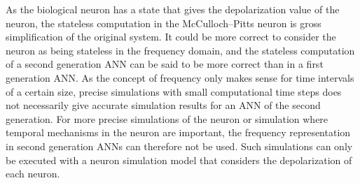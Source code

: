 	As the biological neuron has a state that gives the depolarization value of the neuron, the stateless computation in the McCulloch--Pitts neuron is gross simplification of the original system.
	It could be more correct to consider the neuron as being stateless in the frequency domain, and the stateless computation of a second generation ANN can be said to be more correct than in a first generation ANN.
	As the concept of frequency only makes sense for time intervals of a certain size, precise simulations with small computational time steps does not necessarily give accurate simulation results for an ANN of the second generation. 
	For more precise simulations of the neuron or simulation where temporal mechanisms in the neuron are important, the frequency representation in second generation ANNs can therefore not be used.  %
	Such simulations can only be executed with a neuron simulation model that considers the depolarization of each neuron.


